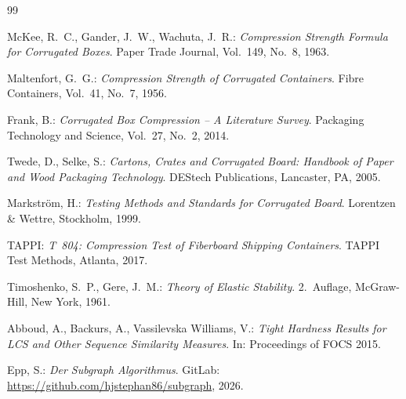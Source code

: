 ﻿\documentclass[a4paper,12pt]{article}
\theoremstyle{definition}
\begin{document}
\begin{thebibliography}{99}

McKee, R.~C., Gander, J.~W., Wachuta, J.~R.:
\emph{Compression Strength Formula for Corrugated Boxes}.
Paper Trade Journal, Vol.~149, No.~8, 1963.

Maltenfort, G.~G.:
\emph{Compression Strength of Corrugated Containers}.
Fibre Containers, Vol.~41, No.~7, 1956.

Frank, B.:
\emph{Corrugated Box Compression -- A Literature Survey}.
Packaging Technology and Science, Vol.~27, No.~2, 2014.

Twede, D., Selke, S.:
\emph{Cartons, Crates and Corrugated Board: Handbook of Paper and Wood
Packaging Technology}.
DEStech Publications, Lancaster, PA, 2005.

Markström, H.:
\emph{Testing Methods and Standards for Corrugated Board}.
Lorentzen \& Wettre, Stockholm, 1999.

TAPPI:
\emph{T~804: Compression Test of Fiberboard Shipping Containers}.
TAPPI Test Methods, Atlanta, 2017.

Timoshenko, S.~P., Gere, J.~M.:
\emph{Theory of Elastic Stability}.
2.~Auflage, McGraw-Hill, New York, 1961.

Abboud, A., Backurs, A., Vassilevska Williams, V.:
\emph{Tight Hardness Results for LCS and Other Sequence Similarity
Measures}.
In: Proceedings of FOCS 2015.

Epp, S.:
\emph{Der Subgraph Algorithmus}.
GitLab: \url{https://github.com/hjstephan86/subgraph}, 2026.

\end{thebibliography}
\end{document}
